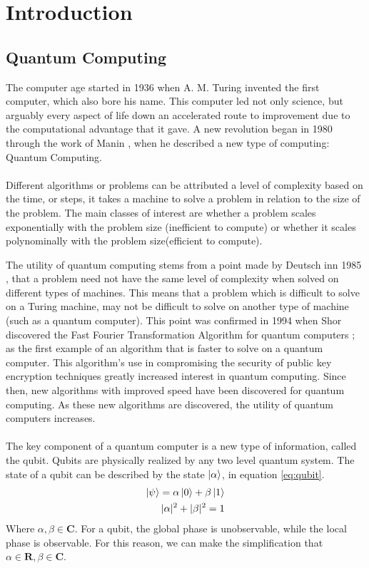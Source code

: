 
\chapter{Introduction}


\section{Quantum Computing}
The computer age started in 1936 when A. M. Turing invented the first computer, which also bore his name. This computer led not only science, but arguably every aspect of life down an accelerated route to improvement due to the computational advantage that it gave. A new revolution began in 1980 through the work of Manin \cite{Manin1980}, when he described a new type of computing: Quantum Computing. 
\\\\ 
Different algorithms or problems can be attributed a level of complexity based on the time, or steps, it takes a machine to solve a problem in relation to the size of the problem. The main classes of interest are whether a problem scales exponentially with the problem size (inefficient to compute) or whether it scales polynominally with the problem size(efficient to compute).

The utility of quantum computing stems from a point made by Deutsch inn 1985 \cite{Deutsch1985}, that a problem need not have the same level of complexity when solved on different types of machines. This means that a problem which is difficult to solve on a Turing machine, may not be difficult to solve on another type of machine (such as a quantum computer). This point was confirmed in 1994 when Shor discovered the Fast Fourier Transformation Algorithm for quantum computers  \cite{Shor1994}; as the first example of an algorithm that is faster to solve on a quantum computer. This algorithm's use in compromising the security of public key encryption techniques greatly increased interest in quantum computing.
Since then, new algorithms with improved speed have been discovered for quantum computing. As these new algorithms are discovered, the utility of quantum computers increases. 
\\\\
The key component of a quantum computer is a new type of information, called the qubit. Qubits are physically realized by any two level quantum system. The state of a qubit can be described by the state $\ket{\alpha}$, in equation \ref{eq:qubit}.
\begin{align}
\ket{\psi} = \alpha\ket{0} + \beta\ket{1}\\
|\alpha|^2+|\beta|^2 = 1	
\label{eq:qubit}
\end{align}
Where $\alpha,\beta\in \textbf{C}$. For a qubit, the global phase is unobservable, while the local phase is observable. For this reason, we can make the simplification that $\alpha \in \textbf{R}, \beta \in \textbf{C}$.
